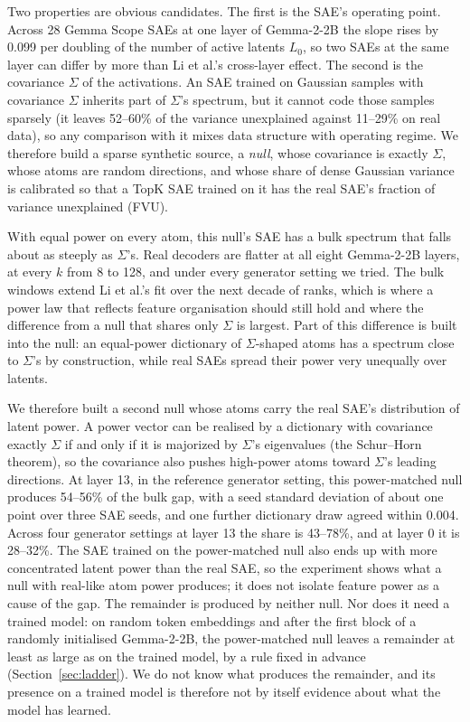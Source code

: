 \documentclass[10pt,twocolumn]{article}
\newcommand{\Sig}{\Sigma}
\newcommand{\Lz}{L_0}
\begin{document}
Two properties are obvious candidates. The first is the SAE's operating point. Across 28 Gemma Scope SAEs at one layer of Gemma-2-2B the slope rises by 0.099 per doubling of the number of active latents $\Lz$, so two SAEs at the same layer can differ by more than Li et al.'s cross-layer effect. The second is the covariance $\Sig$ of the activations. An SAE trained on Gaussian samples with covariance $\Sig$ inherits part of $\Sig$'s spectrum, but it cannot code those samples sparsely (it leaves 52--60\% of the variance unexplained against 11--29\% on real data), so any comparison with it mixes data structure with operating regime. We therefore build a sparse synthetic source, a \emph{null}, whose covariance is exactly $\Sig$, whose atoms are random directions, and whose share of dense Gaussian variance is calibrated so that a TopK SAE \citep{gao2024scaling} trained on it has the real SAE's fraction of variance unexplained (FVU).

With equal power on every atom, this null's SAE has a bulk spectrum that falls about as steeply as $\Sig$'s. Real decoders are flatter at all eight Gemma-2-2B layers, at every $k$ from 8 to 128, and under every generator setting we tried. The bulk windows extend Li et al.'s fit over the next decade of ranks, which is where a power law that reflects feature organisation should still hold and where the difference from a null that shares only $\Sig$ is largest. Part of this difference is built into the null: an equal-power dictionary of $\Sig$-shaped atoms has a spectrum close to $\Sig$'s by construction, while real SAEs spread their power very unequally over latents.

We therefore built a second null whose atoms carry the real SAE's distribution of latent power. A power vector can be realised by a dictionary with covariance exactly $\Sig$ if and only if it is majorized by $\Sig$'s eigenvalues (the Schur--Horn theorem), so the covariance also pushes high-power atoms toward $\Sig$'s leading directions. At layer 13, in the reference generator setting, this power-matched null produces 54--56\% of the bulk gap, with a seed standard deviation of about one point over three SAE seeds, and one further dictionary draw agreed within 0.004. Across four generator settings at layer 13 the share is 43--78\%, and at layer 0 it is 28--32\%. The SAE trained on the power-matched null also ends up with more concentrated latent power than the real SAE, so the experiment shows what a null with real-like atom power produces; it does not isolate feature power as a cause of the gap. The remainder is produced by neither null. Nor does it need a trained model: on random token embeddings and after the first block of a randomly initialised Gemma-2-2B, the power-matched null leaves a remainder at least as large as on the trained model, by a rule fixed in advance (Section~\ref{sec:ladder}). We do not know what produces the remainder, and its presence on a trained model is therefore not by itself evidence about what the model has learned.
\end{document}
